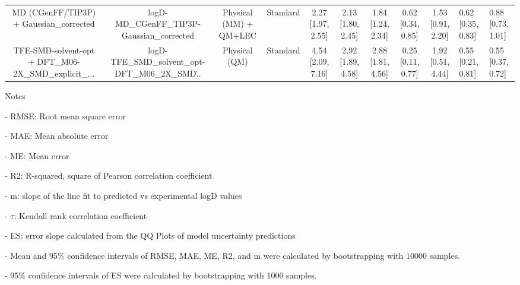 \documentclass{article}
\begin{document}
\begin{center}
\begin{longtable}{|ccccccccc|}
            MD (CGenFF/TIP3P) + Gaussian_corrected &         logD-MD\_CGenFF\_TIP3P-Gaussian\_corrected &  Physical (MM) + QM+LEC &   Standard &  2.27 [1.97, 2.55] &  2.13 [1.80, 2.45] &     1.84 [1.24, 2.34] &  0.62 [0.34, 0.85] &  1.53 [0.91, 2.20] &   0.62 [0.35, 0.83] &   0.88 [0.73, 1.01] \\
 TFE-SMD-solvent-opt + DFT_M06-2X_SMD_explicit_... &  logD-TFE\_SMD\_solvent\_opt-DFT\_M06\_2X\_SMD\... &           Physical (QM) &   Standard &  4.54 [2.09, 7.16] &  2.92 [1.89, 4.58] &     2.88 [1.81, 4.56] &  0.25 [0.11, 0.77] &  1.92 [0.51, 4.44] &   0.55 [0.21, 0.81] &   0.55 [0.37, 0.72] \\
\end{longtable}
\end{center}

Notes

- RMSE: Root mean square error

- MAE: Mean absolute error

- ME: Mean error

- R2: R-squared, square of Pearson correlation coefficient

- m: slope of the line fit to predicted vs experimental logD values

- $\tau$:  Kendall rank correlation coefficient

- ES: error slope calculated from the QQ Plots of model uncertainty predictions

- Mean and 95\% confidence intervals of RMSE, MAE, ME, R2, and m were calculated by bootstrapping with 10000 samples.

- 95\% confidence intervals of ES were calculated by bootstrapping with 1000 samples.\end{document}
\end{document}
